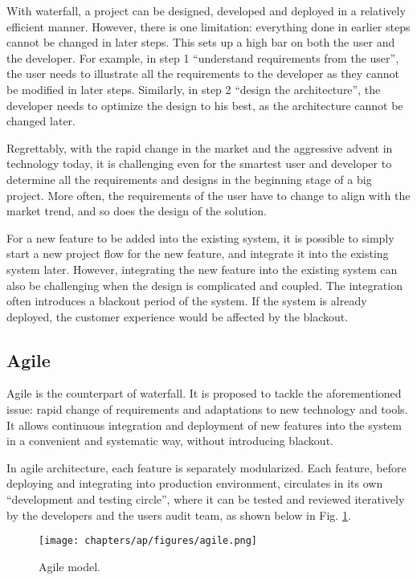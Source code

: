 With waterfall, a project can be designed, developed and deployed in a relatively efficient manner. However, there is one limitation: everything done in earlier steps cannot be changed in later steps. This sets up a high bar on both the user and the developer. For example, in step 1 ``understand requirements from the user'', the user needs to illustrate all the requirements to the developer as they cannot be modified in later steps. Similarly, in step 2 ``design the architecture'', the developer needs to optimize the design to his best, as the architecture cannot be changed later.

Regrettably, with the rapid change in the market and the aggressive advent in technology today, it is challenging even for the smartest user and developer to determine all the requirements and designs in the beginning stage of a big project. More often, the requirements of the user have to change to align with the market trend, and so does the design of the solution.

For a new feature to be added into the existing system, it is possible to simply start a new project flow for the new feature, and integrate it into the existing system later. However, integrating the new feature into the existing system can also be challenging when the design is complicated and coupled. The integration often introduces a blackout period of the system. If the system is already deployed, the customer experience would be affected by the blackout.

\subsection{Agile}

Agile is the counterpart of waterfall. It is proposed to tackle the aforementioned issue: rapid change of requirements and adaptations to new technology and tools. It allows continuous integration and deployment of new features into the system in a convenient and systematic way, without introducing blackout.

In agile architecture, each feature is separately modularized. Each feature, before deploying and integrating into production environment, circulates in its own ``development and testing circle'', where it can be tested and reviewed iteratively by the developers and the users audit team, as shown below in Fig. \ref{ch:cicd:fig:agile}.
\begin{figure}[htbp]
	\centering
	\texttt{[image: chapters/ap/figures/agile.png]}
	\caption{Agile model.} \label{ch:cicd:fig:agile}
\end{figure}

